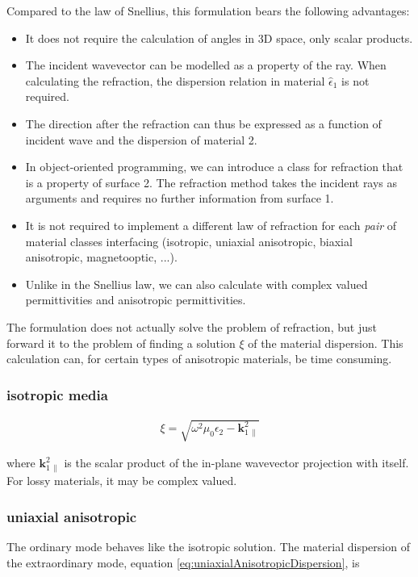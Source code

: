 \documentclass[12pt,a4paper,twoside,openright,BCOR10mm,headsepline,titlepage,abstracton,chapterprefix,final]{scrreprt}
\newcommand\Vector[1]{{\mathbf{#1}}}
\newcommand\wavenumber{k}
\newcommand\Wavevector{\Vector{\wavenumber}}
\newcommand\Tensor[1]{\hat{#1}}
\newcommand\permittivity{\Tensor{\epsilon}}
\begin{document}
Compared to the law of Snellius, this formulation bears the following advantages:
\begin{itemize}
 \item It does not require the calculation of angles in 3D space, only scalar products.
 \item The incident wavevector can be modelled as a property of the ray. When calculating the refraction, 
       the dispersion relation in material $\permittivity_1$ is not required.
 \item The direction after the refraction can thus be expressed as a function of incident wave and the dispersion of material 2.
 \item In object-oriented programming, we can introduce a class for refraction that is a property of surface 2.
       The refraction method takes the incident rays as arguments and requires no further information from surface 1.
 \item It is not required to implement a different law of refraction for each \emph{pair} of material classes interfacing 
       (isotropic, uniaxial anisotropic, biaxial anisotropic, magnetooptic, ...).
 \item Unlike in the Snellius law, we can also calculate with complex valued permittivities and anisotropic permittivities.
\end{itemize}
The formulation does not actually solve the problem of refraction, but just forward it to the problem of finding a solution $\xi$ of the material dispersion. 
This calculation can, for certain types of anisotropic materials, be time consuming.

\subsubsection{isotropic media}
\begin{align}
 \xi = \sqrt{\omega^2 \mu_0 \epsilon_2 - \Wavevector_{1\,\parallel}^2}
\end{align}

where $\Wavevector_{1\,\parallel}^2$ is the scalar product of the in-plane wavevector projection with itself.
For lossy materials, it may be complex valued.


\subsubsection{uniaxial anisotropic}
The ordinary mode behaves like the isotropic solution.
The material dispersion of the extraordinary mode, equation \ref{eq:uniaxialAnisotropicDispersion}, is
\end{document}
